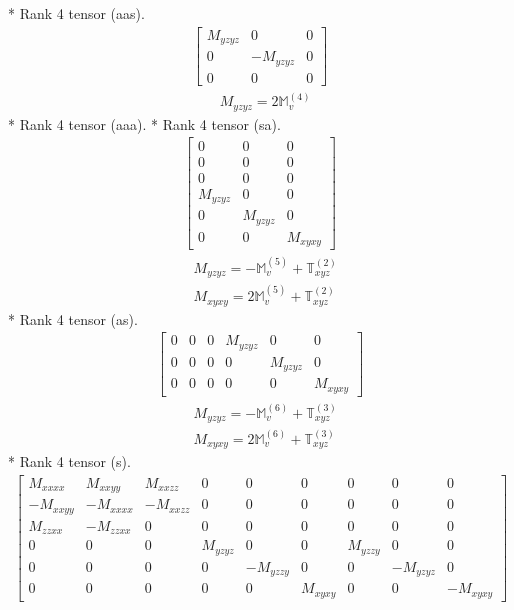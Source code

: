 \documentclass[fleqn,8pt,landscape]{jsarticle}
\begin{document}
* Rank 4 tensor (aas).
\begin{align*}
\begin{bmatrix} M_{yzyz} & 0 & 0 \\ 0 & - M_{yzyz} & 0 \\ 0 & 0 & 0 \end{bmatrix}
\end{align*}
\begin{align*}
& M_{yzyz} = 2 \mathbb{M}_{v}^{(4)}
\end{align*}
* Rank 4 tensor (aaa).
* Rank 4 tensor (sa).
\begin{align*}
\begin{bmatrix} 0 & 0 & 0 \\ 0 & 0 & 0 \\ 0 & 0 & 0 \\ M_{yzyz} & 0 & 0 \\ 0 & M_{yzyz} & 0 \\ 0 & 0 & M_{xyxy} \end{bmatrix}
\end{align*}
\begin{align*}
& M_{yzyz} = - \mathbb{M}_{v}^{(5)} + \mathbb{T}_{xyz}^{(2)} \\
& M_{xyxy} = 2 \mathbb{M}_{v}^{(5)} + \mathbb{T}_{xyz}^{(2)}
\end{align*}
* Rank 4 tensor (as).
\begin{align*}
\begin{bmatrix} 0 & 0 & 0 & M_{yzyz} & 0 & 0 \\ 0 & 0 & 0 & 0 & M_{yzyz} & 0 \\ 0 & 0 & 0 & 0 & 0 & M_{xyxy} \end{bmatrix}
\end{align*}
\begin{align*}
& M_{yzyz} = - \mathbb{M}_{v}^{(6)} + \mathbb{T}_{xyz}^{(3)} \\
& M_{xyxy} = 2 \mathbb{M}_{v}^{(6)} + \mathbb{T}_{xyz}^{(3)}
\end{align*}
* Rank 4 tensor (s).
\begin{align*}
\begin{bmatrix} M_{xxxx} & M_{xxyy} & M_{xxzz} & 0 & 0 & 0 & 0 & 0 & 0 \\ - M_{xxyy} & - M_{xxxx} & - M_{xxzz} & 0 & 0 & 0 & 0 & 0 & 0 \\ M_{zzxx} & - M_{zzxx} & 0 & 0 & 0 & 0 & 0 & 0 & 0 \\ 0 & 0 & 0 & M_{yzyz} & 0 & 0 & M_{yzzy} & 0 & 0 \\ 0 & 0 & 0 & 0 & - M_{yzzy} & 0 & 0 & - M_{yzyz} & 0 \\ 0 & 0 & 0 & 0 & 0 & M_{xyxy} & 0 & 0 & - M_{xyxy} \end{bmatrix}
\end{align*}
\end{document}
